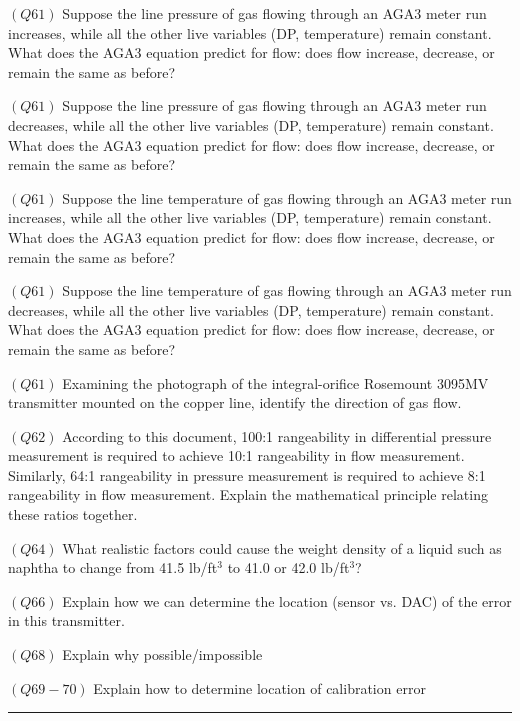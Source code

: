 \medskip
\item{$(Q61)$} Suppose the line pressure of gas flowing through an AGA3 meter run increases, while all the other live variables (DP, temperature) remain constant.  What does the AGA3 equation predict for flow: does flow increase, decrease, or remain the same as before?
\item{$(Q61)$} Suppose the line pressure of gas flowing through an AGA3 meter run decreases, while all the other live variables (DP, temperature) remain constant.  What does the AGA3 equation predict for flow: does flow increase, decrease, or remain the same as before?
\item{$(Q61)$} Suppose the line temperature of gas flowing through an AGA3 meter run increases, while all the other live variables (DP, temperature) remain constant.  What does the AGA3 equation predict for flow: does flow increase, decrease, or remain the same as before?
\item{$(Q61)$} Suppose the line temperature of gas flowing through an AGA3 meter run decreases, while all the other live variables (DP, temperature) remain constant.  What does the AGA3 equation predict for flow: does flow increase, decrease, or remain the same as before?
\item{$(Q61)$} Examining the photograph of the integral-orifice Rosemount 3095MV transmitter mounted on the copper line, identify the direction of gas flow.
\item{$(Q62)$} According to this document, 100:1 rangeability in differential pressure measurement is required to achieve 10:1 rangeability in flow measurement.  Similarly, 64:1 rangeability in pressure measurement is required to achieve 8:1 rangeability in flow measurement.  Explain the mathematical principle relating these ratios together.
\item{$(Q64)$} What realistic factors could cause the weight density of a liquid such as naphtha to change from 41.5 lb/ft$^{3}$ to 41.0 or 42.0 lb/ft$^{3}$?
\item{$(Q66)$} Explain how we can determine the location (sensor vs. DAC) of the error in this transmitter.
\item{$(Q68)$} Explain why possible/impossible
\item{$(Q69-70)$} Explain how to determine location of calibration error
\medskip


\filbreak \vskip 5pt \hrule \vskip 5pt  \vskip 10pt



\bye



